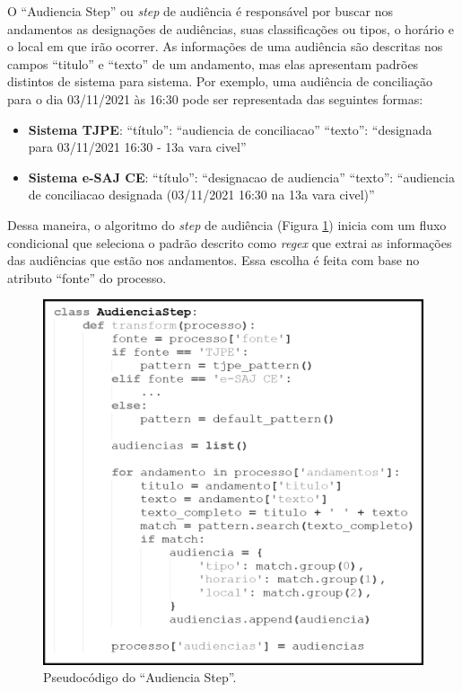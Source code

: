 O \enquote{Audiencia Step} ou \textit{step} de audiência é responsável por buscar nos andamentos as designações de audiências, suas classificações ou tipos, o horário e o local em que irão ocorrer. As informações de uma audiência são descritas nos campos \enquote{titulo} e \enquote{texto} de um andamento, mas elas apresentam padrões distintos de sistema para sistema. Por exemplo, uma audiência de conciliação para o dia 03/11/2021 às 16:30 pode ser representada das seguintes formas:


\begin{itemize}
    \item \textbf{Sistema TJPE}:
        \subitem \enquote{título}: \enquote{audiencia de conciliacao}
        \subitem \enquote{texto}: \enquote{designada para 03/11/2021 16:30 - 13a vara civel}
    \item \textbf{Sistema e-SAJ CE}:
        \subitem \enquote{título}: \enquote{designacao de audiencia}
        \subitem \enquote{texto}: \enquote{audiencia de conciliacao designada (03/11/2021 16:30 na 13a vara civel)}
\end{itemize}

Dessa maneira, o algoritmo do \textit{step} de audiência (Figura \ref{fig:audienciaStep}) inicia com um fluxo condicional que seleciona o padrão descrito como \textit{regex} que extrai as informações das audiências que estão nos andamentos. Essa escolha é feita com base no atributo \enquote{fonte} do processo.

\begin{figure}[ht]
\centering
\includegraphics[width=.8\textwidth]{imagens/audiencia_step.png}
\caption{Pseudocódigo do \enquote{Audiencia Step}.}
\label{fig:audienciaStep}
\end{figure}

